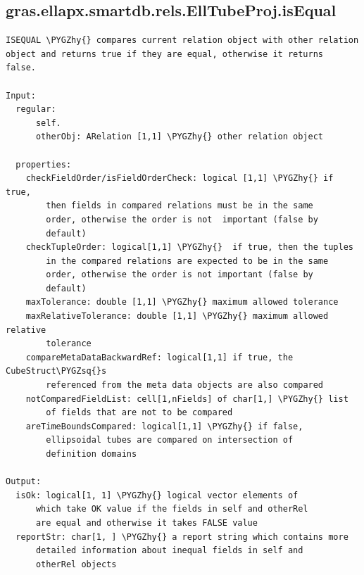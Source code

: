 \documentclass[letterpaper,10pt,english]{sphinxmanual}
\def\PYGZhy{\char`\-}
\def\PYGZsq{\char`\'}
\begin{document}
\subsection{gras.ellapx.smartdb.rels.EllTubeProj.isEqual}
\label{chap_functions:gras-ellapx-smartdb-rels-elltubeproj-isequal}
\begin{Verbatim}[commandchars=\\\{\}]
ISEQUAL \PYGZhy{} compares current relation object with other relation
object and returns true if they are equal, otherwise it returns
false.

Input:
  regular:
      self.
      otherObj: ARelation [1,1] \PYGZhy{} other relation object

  properties:
    checkFieldOrder/isFieldOrderCheck: logical [1,1] \PYGZhy{} if true,
        then fields in compared relations must be in the same
        order, otherwise the order is not  important (false by
        default)
    checkTupleOrder: logical[1,1] \PYGZhy{}  if true, then the tuples
        in the compared relations are expected to be in the same
        order, otherwise the order is not important (false by
        default)
    maxTolerance: double [1,1] \PYGZhy{} maximum allowed tolerance
    maxRelativeTolerance: double [1,1] \PYGZhy{} maximum allowed relative
        tolerance
    compareMetaDataBackwardRef: logical[1,1] if true, the CubeStruct\PYGZsq{}s
        referenced from the meta data objects are also compared
    notComparedFieldList: cell[1,nFields] of char[1,] \PYGZhy{} list
        of fields that are not to be compared
    areTimeBoundsCompared: logical[1,1] \PYGZhy{} if false,
        ellipsoidal tubes are compared on intersection of
        definition domains

Output:
  isOk: logical[1, 1] \PYGZhy{} logical vector elements of
      which take OK value if the fields in self and otherRel
      are equal and otherwise it takes FALSE value
  reportStr: char[1, ] \PYGZhy{} a report string which contains more
      detailed information about inequal fields in self and
      otherRel objects
\end{Verbatim}
\end{document}
